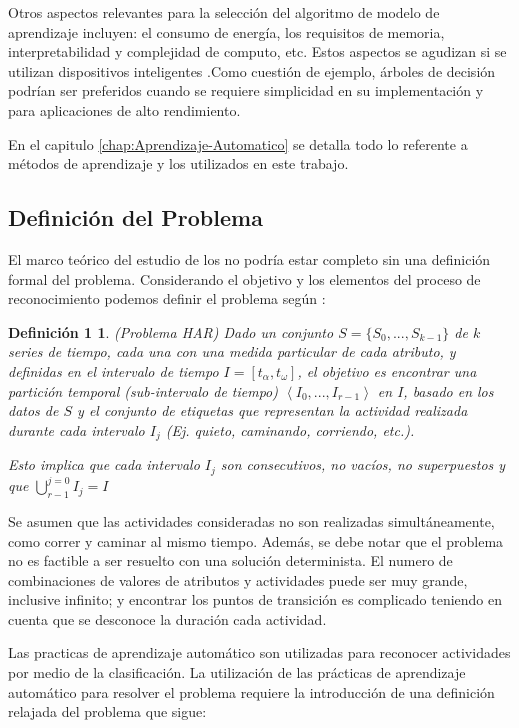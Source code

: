 Otros aspectos relevantes para la selección del algoritmo de modelo
de aprendizaje incluyen: el consumo de energía, los requisitos de
memoria, interpretabilidad y complejidad de computo, etc. Estos aspectos
se agudizan si se utilizan dispositivos inteligentes .Como cuestión
de ejemplo, árboles de decisión podrían ser preferidos cuando se requiere
simplicidad en su implementación y  para aplicaciones de
alto rendimiento\cite{ReyesOrtiz2015}.

En el capitulo \ref{chap:Aprendizaje-Automatico} se detalla todo
lo referente a métodos de aprendizaje y los utilizados en este trabajo.

\subsection{Definición del Problema}

El marco teórico del estudio de los  no podría estar completo
sin una definición formal del problema. Considerando el objetivo y
los elementos del proceso de reconocimiento podemos definir el problema
según \cite{LaraLabrador2013}:

\newtheorem{defi}{Definición 1}

\begin{defi}(Problema HAR) Dado un conjunto $S=\{S_{0},...,S_{k-1}\}$
de $k$ series de tiempo, cada una con una medida particular de cada
atributo, y definidas en el intervalo de tiempo $I=\left[t_{\alpha},t_{\omega}\right]$,
el objetivo es encontrar una partición temporal (sub-intervalo de
tiempo) $\left\langle I_{0},...,I_{r-1}\right\rangle $ en $I$, basado
en los datos de $S$ y el conjunto de etiquetas que representan la
actividad realizada durante cada intervalo $I_{j}$ (Ej. quieto, caminando,
corriendo, etc.). 

Esto implica que cada intervalo $I_{j}$ son consecutivos, no vacíos,
no superpuestos y que ${\displaystyle \bigcup_{r-1}^{j=0}{I_{j}=I}}$
\end{defi}

Se asumen que las actividades consideradas no son realizadas simultáneamente,
como correr y caminar al mismo tiempo. Además, se debe notar que el
problema  no es factible a ser resuelto con una solución
determinista. El numero de combinaciones de valores de atributos y
actividades puede ser muy grande, inclusive infinito; y encontrar
los puntos de transición es complicado teniendo en cuenta que se desconoce
la duración cada actividad. 

Las practicas de aprendizaje automático son utilizadas para reconocer
actividades por medio de la clasificación. La utilización de las prácticas
de aprendizaje automático para resolver el problema requiere la introducción
de una definición relajada del problema  que sigue: 

